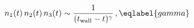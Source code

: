 \begin{equation}
n_1(t)\,n_2(t)\,n_3(t) \sim \frac 1{(t_{\rm wall}-t)^{\gamma}} \,,
\eqlabel{gamma}
\end{equation}

